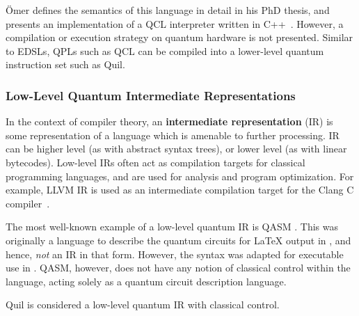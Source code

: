\documentclass[conference]{IEEEtran}
\newcommand{\defn}[1]{\textbf{#1}}
\begin{document}
\"Omer defines the semantics of this language in detail in his PhD thesis, and presents an implementation of a QCL interpreter written in C++~\cite{qclweb}. However, a compilation or execution strategy on quantum hardware is not presented. Similar to EDSLs, QPLs such as QCL can be compiled into a lower-level quantum instruction set such as Quil.

\subsubsection{Low-Level Quantum Intermediate Representations}
In the context of compiler theory, an \defn{intermediate representation} (IR) is some representation of a language which is amenable to further processing. IR can be higher level (as with abstract syntax trees), or lower level (as with linear bytecodes). Low-level IRs often act as compilation targets for classical programming languages, and are used for analysis and program optimization. For example, LLVM IR \cite{LLVM:CGO04} is used as an intermediate compilation target for the Clang C compiler~\cite{clang:URL}.

The most well-known example of a low-level quantum IR is QASM \cite{circqasm}. This was originally a language to describe the quantum circuits for \LaTeX{} output in \cite{nielsen2010quantum}, and hence, \emph{not} an IR in that form. However, the syntax was adapted for executable use in \cite{qasmtools}. QASM, however, does not have any notion of classical control within the language, acting solely as a quantum circuit description language.

Quil is considered a low-level quantum IR with classical control.



\end{document}
